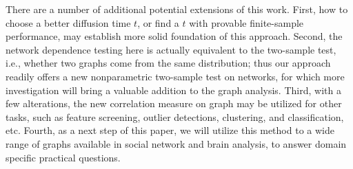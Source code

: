 \documentclass[11pt]{article}
\theoremstyle{definition}
\begin{document}
There are a number of additional potential extensions of this work. First, how to choose a better diffusion time $t$, or find a $t$ with provable finite-sample performance, may establish more solid foundation of this approach. Second, the network dependence testing here is actually equivalent to the two-sample test, i.e., whether two graphs come from the same distribution; thus our approach readily offers a new nonparametric two-sample test on networks, for which more investigation will bring a valuable addition to the graph analysis. Third, with a few alterations, the new correlation measure on graph may be utilized for other tasks, such as feature screening, outlier detections, clustering, and classification, etc. Fourth, as a next step of this paper, we will utilize this method to a wide range of graphs available in social network and brain analysis, to answer domain specific practical questions.


\end{document}
